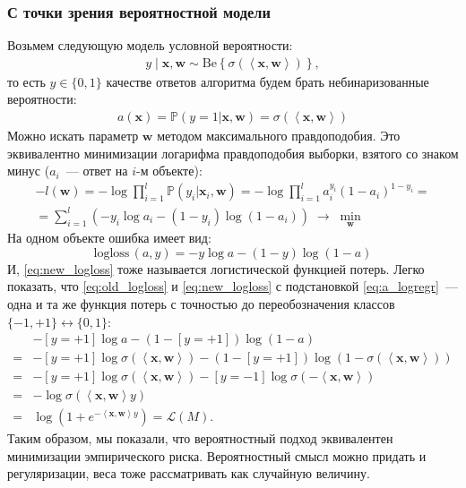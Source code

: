 \documentclass[12pt]{article}
\renewcommand{\vec}[1]{\mathbf{#1}}
\begin{document}
\subsubsection{С точки зрения вероятностной модели}
Возьмем следующую модель условной вероятности:
\begin{align}
    \label{eq:bernoulli}
    y \mid \vec{x},\vec{w} \sim \text{Be}\left\{\sigma\left(\left<\vec{x},\vec{w}\right>\right)\right\},
\end{align}
то есть $y\in\{0, 1\}$ качестве ответов алгоритма будем брать небинаризованные вероятности:
\begin{gather}
    \label{eq:a_logregr}
    a(\vec{x}) = \mathbb{P}(y=1 | \vec{x}, \vec{w})=
    \sigma\left(\left<\vec{x},\vec{w}\right>\right)
\end{gather}
Можно искать параметр $\vec{w}$ методом максимального правдоподобия. Это эквивалентно минимизации логарифма правдоподобия выборки, взятого со знаком минус ($a_i$~--- ответ на $i$-м объекте):
\begin{gather*}
    -l(\vec{w})=-\log\prod_{i=1}^{l}\mathbb{P}(y_i | \vec{x}_i, \vec{w}) =
    -\log\prod_{i=1}^{l}a_i^{y_i}(1-a_i)^{1-y_i} = \\
    =\sum_{i=1}^{l}(-y_i\log{a_i} - (1-y_i)\log(1-a_i))\; \rightarrow \;\min_\vec{w}
\end{gather*}
На одном объекте ошибка имеет вид:
\begin{equation}
    \label{eq:new_logloss}
    \text{logloss}\,(a, y) = -y\log{a} - (1-y)\log(1-a)
\end{equation}
И, \eqref{eq:new_logloss} тоже называется логистической функцией потерь. Легко показать, что \eqref{eq:old_logloss} и \eqref{eq:new_logloss} с подстановкой \eqref{eq:a_logregr}~--- одна и та же функция потерь с точностью до переобозначения классов $\{-1, +1\} \leftrightarrow \{0, 1\}$:
\begin{align*}
     &-[y=+1]\log{a} - (1-[y=+1])\log(1-a)\\
    =&-[y=+1]\log{\sigma\left(\left<\vec{x},\vec{w}\right>\right)} - (1-[y=+1])\log(1-\sigma\left(\left<\vec{x},\vec{w}\right>\right))\\
    =&-[y=+1]\log{\sigma\left(\left<\vec{x},\vec{w}\right>\right)} - [y=-1]\log\sigma\left(-\left<\vec{x},\vec{w}\right>\right)\\
    =&-\log{\sigma\left(\left<\vec{x},\vec{w}\right>y\right)}\\
    =&\log{(1+e^{-\left<\vec{x},\vec{w}\right>y})}=\mathcal{L}(M).
\end{align*}
Таким образом, мы показали, что вероятностный подход эквивалентен минимизации эмпирического риска. Вероятностный смысл можно придать и регуляризации, веса тоже рассматривать как случайную величину.
\end{document}
